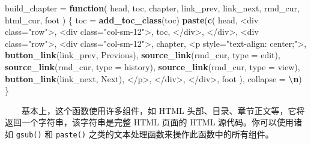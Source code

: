 \documentclass[
  12pt,
]{krantz}
\newenvironment{Shaded}{\begin{snugshade}}{\end{snugshade}}
\newcommand{\AttributeTok}[1]{\textcolor[rgb]{0.13,0.29,0.53}{#1}}
\newcommand{\ControlFlowTok}[1]{\textcolor[rgb]{0.13,0.29,0.53}{\textbf{#1}}}
\newcommand{\FunctionTok}[1]{\textcolor[rgb]{0.13,0.29,0.53}{\textbf{#1}}}
\newcommand{\NormalTok}[1]{#1}
\newcommand{\OtherTok}[1]{\textcolor[rgb]{0.56,0.35,0.01}{#1}}
\newcommand{\SpecialCharTok}[1]{\textcolor[rgb]{0.81,0.36,0.00}{\textbf{#1}}}
\newcommand{\StringTok}[1]{\textcolor[rgb]{0.31,0.60,0.02}{#1}}
\theoremstyle{definition}
\theoremstyle{definition}
\theoremstyle{definition}
\theoremstyle{definition}
\theoremstyle{remark}
\begin{document}
\begin{Shaded}
\begin{Highlighting}[]
\NormalTok{build\_chapter }\OtherTok{=} \ControlFlowTok{function}\NormalTok{(}
\NormalTok{  head, toc, chapter, link\_prev, link\_next, rmd\_cur, html\_cur, foot}
\NormalTok{) \{}
\NormalTok{  toc }\OtherTok{=} \FunctionTok{add\_toc\_class}\NormalTok{(toc)}
  \FunctionTok{paste}\NormalTok{(}\FunctionTok{c}\NormalTok{(}
\NormalTok{    head,}
    \StringTok{\textquotesingle{}\textless{}div class="row"\textgreater{}\textquotesingle{}}\NormalTok{,}
    \StringTok{\textquotesingle{}\textless{}div class="col{-}sm{-}12"\textgreater{}\textquotesingle{}}\NormalTok{,}
\NormalTok{    toc,}
    \StringTok{\textquotesingle{}\textless{}/div\textgreater{}\textquotesingle{}}\NormalTok{,}
    \StringTok{\textquotesingle{}\textless{}/div\textgreater{}\textquotesingle{}}\NormalTok{,}
    \StringTok{\textquotesingle{}\textless{}div class="row"\textgreater{}\textquotesingle{}}\NormalTok{,}
    \StringTok{\textquotesingle{}\textless{}div class="col{-}sm{-}12"\textgreater{}\textquotesingle{}}\NormalTok{,}
\NormalTok{    chapter,}
    \StringTok{\textquotesingle{}\textless{}p style="text{-}align: center;"\textgreater{}\textquotesingle{}}\NormalTok{,}
    \FunctionTok{button\_link}\NormalTok{(link\_prev, }\StringTok{\textquotesingle{}Previous\textquotesingle{}}\NormalTok{),}
    \FunctionTok{source\_link}\NormalTok{(rmd\_cur, }\AttributeTok{type =} \StringTok{\textquotesingle{}edit\textquotesingle{}}\NormalTok{),}
    \FunctionTok{source\_link}\NormalTok{(rmd\_cur, }\AttributeTok{type =} \StringTok{\textquotesingle{}history\textquotesingle{}}\NormalTok{),}
    \FunctionTok{source\_link}\NormalTok{(rmd\_cur, }\AttributeTok{type =} \StringTok{\textquotesingle{}view\textquotesingle{}}\NormalTok{),}
    \FunctionTok{button\_link}\NormalTok{(link\_next, }\StringTok{\textquotesingle{}Next\textquotesingle{}}\NormalTok{),}
    \StringTok{\textquotesingle{}\textless{}/p\textgreater{}\textquotesingle{}}\NormalTok{,}
    \StringTok{\textquotesingle{}\textless{}/div\textgreater{}\textquotesingle{}}\NormalTok{,}
    \StringTok{\textquotesingle{}\textless{}/div\textgreater{}\textquotesingle{}}\NormalTok{,}
\NormalTok{    foot}
\NormalTok{  ), }\AttributeTok{collapse =} \StringTok{\textquotesingle{}}\SpecialCharTok{\textbackslash{}n}\StringTok{\textquotesingle{}}\NormalTok{)}
\NormalTok{\}}
\end{Highlighting}
\end{Shaded}

  基本上，这个函数使用许多组件，如 HTML 头部、目录、章节正文等，它将返回一个字符串，该字符串是完整 HTML 页面的 HTML 源代码。你可以使用诸如 \texttt{gsub()} 和 \texttt{paste()} 之类的文本处理函数来操作此函数中的所有组件。
\end{document}
